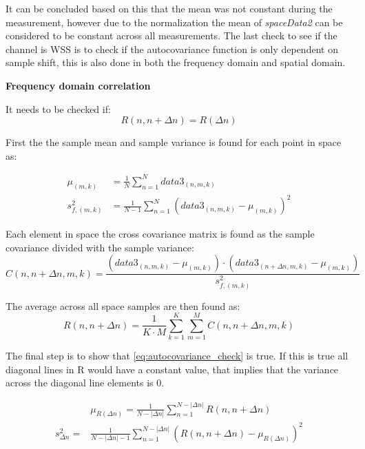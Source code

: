It can be concluded based on this that the mean was not constant during the measurement, however due to the normalization the mean of \textit{spaceData2} can be considered to be constant across all measurements. The last check to see if the channel is \gls{WSS} is to check if the autocovariance function is only dependent on sample shift, this is also done in both the frequency domain and spatial domain.

\textbf{Frequency domain correlation}

It needs to be checked if:
\begin{equation}\label{eq:autocovariance_check}
R(n,n+\Delta n) = R(\Delta n) 
\end{equation}

First the the sample mean and sample variance is found for each point in space as:

\begin{align}
\mu_{(m,k)} &= \frac{1}{N}\sum_{n = 1}^{N} data3_{(n,m,k)} \\
s_{f,(m,k)}^2 &= \frac{1}{N-1}\sum_{n = 1}^{N} \left( data3_{(n,m,k)} - \mu_{(m,k)} \right)^2 
\end{align}

Each element in space the cross covariance matrix is found as the sample covariance divided with the sample variance:
\begin{equation}
C(n,n+\Delta n,m,k) = \frac{\left(data3_{(n,m,k)}-\mu_{(m,k)}\right)\cdot \left(data3_{(n+\Delta n,m,k)}-\mu_{(m,k)}\right)}{s_{f,(m,k)}^2}
\end{equation}

The average across all space samples are then found as:
\begin{equation}
R(n,n+\Delta n) = \frac{1}{K\cdot M}\sum_{k = 1}^{K}\sum_{m = 1}^{M} C(n,n+\Delta n,m,k)
\end{equation}


The final step is to show that \autoref{eq:autocovariance_check} is true. If this is true all diagonal lines in R would have a constant value, that implies that the variance across the diagonal line elements is 0. 

\begin{align}
&\mu_{R(\Delta n)} = \frac{1}{N-|\Delta n|}\sum_{n = 1}^{N-|\Delta n|} R(n,n+\Delta n) \label{EQcor}\\
s_{\Delta n}^2 = &\frac{1}{N-|\Delta n|-1}\sum_{n = 1}^{N-|\Delta n|} \left( R(n,n+\Delta n) - \mu_{R(\Delta n)} \right)^2 \label{eq:variance_of_covariance}
\end{align}

